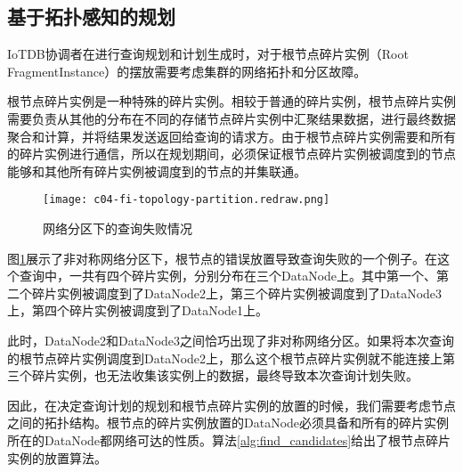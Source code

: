 \subsection{基于拓扑感知的规划}

IoTDB协调者在进行查询规划和计划生成时，对于根节点碎片实例（Root FragmentInstance）的摆放需要考虑集群的网络拓扑和分区故障。

根节点碎片实例是一种特殊的碎片实例。相较于普通的碎片实例，根节点碎片实例需要负责从其他的分布在不同的存储节点碎片实例中汇聚结果数据，进行最终数据聚合和计算，并将结果发送返回给查询的请求方。由于根节点碎片实例需要和所有的碎片实例进行通信，所以在规划期间，必须保证根节点碎片实例被调度到的节点能够和其他所有碎片实例被调度到的节点的并集联通。


\begin{figure}
  \centering
  \texttt{[image: c04-fi-topology-partition.redraw.png]}
  \caption{网络分区下的查询失败情况}
  \label{fig:fi-topology-partition}
\end{figure}

图\ref{fig:fi-topology-partition}展示了非对称网络分区下，根节点的错误放置导致查询失败的一个例子。在这个查询中，一共有四个碎片实例，分别分布在三个DataNode上。其中第一个、第二个碎片实例被调度到了DataNode2上，第三个碎片实例被调度到了DataNode3上，第四个碎片实例被调度到了DataNode1上。

此时，DataNode2和DataNode3之间恰巧出现了非对称网络分区。如果将本次查询的根节点碎片实例调度到DataNode2上，那么这个根节点碎片实例就不能连接上第三个碎片实例，也无法收集该实例上的数据，最终导致本次查询计划失败。

因此，在决定查询计划的规划和根节点碎片实例的放置的时候，我们需要考虑节点之间的拓扑结构。根节点的碎片实例放置的DataNode必须具备和所有的碎片实例所在的DataNode都网络可达的性质。算法\ref{alg:find_candidates}给出了根节点碎片实例的放置算法。


